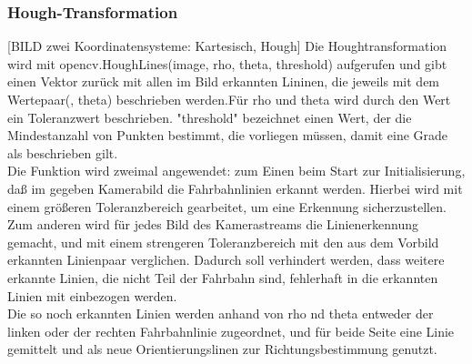 \subsubsection{Hough-Transformation}
[BILD zwei Koordinatensysteme: Kartesisch, Hough]
Die Houghtransformation wird mit opencv.HoughLines(image, rho, theta, threshold) aufgerufen und gibt einen
Vektor zurück mit allen im Bild erkannten Lininen, die jeweils mit dem
Wertepaar(\rho, theta) beschrieben werden.Für rho und theta wird durch den Wert
ein Toleranzwert beschrieben. "threshold" bezeichnet einen Wert, der
die Mindestanzahl von Punkten bestimmt, die vorliegen müssen, damit eine Grade
als beschrieben gilt.\\
Die Funktion wird zweimal angewendet: zum Einen beim Start zur Initialisierung,
daß im gegeben Kamerabild die Fahrbahnlinien erkannt werden. Hierbei wird mit
einem größeren Toleranzbereich gearbeitet, um eine Erkennung sicherzustellen.
Zum anderen wird für jedes Bild des Kamerastreams die Linienerkennung gemacht,
und mit einem strengeren Toleranzbereich mit den aus dem Vorbild erkannten
Linienpaar verglichen. Dadurch soll verhindert werden, dass weitere erkannte
Linien, die nicht Teil der Fahrbahn sind, fehlerhaft in die erkannten Linien mit
einbezogen werden.\\
Die so noch erkannten Linien werden anhand von rho nd theta  entweder der linken 
oder der rechten Fahrbahnlinie zugeordnet, und für beide Seite eine Linie
gemittelt und als neue Orientierungslinen zur Richtungsbestimmung genutzt.\\

